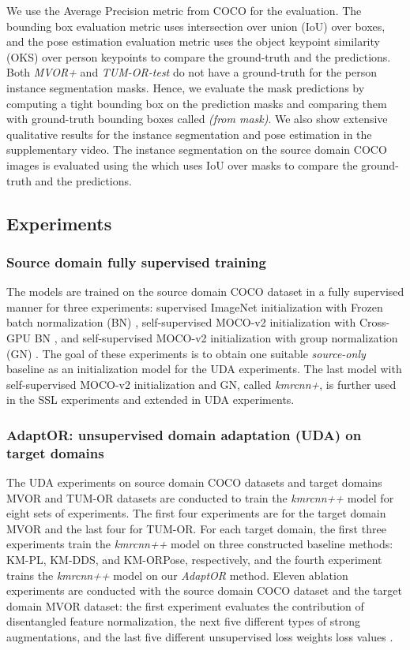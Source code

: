 We use the Average Precision \emph{} metric from COCO \citep{lin2014microsoft} for the evaluation. The bounding box evaluation metric \emph{} uses intersection over union (IoU) over boxes, and the pose estimation evaluation metric \emph{} uses the object keypoint similarity (OKS) over person keypoints to compare the ground-truth and the predictions. Both \emph{MVOR+} and \emph{TUM-OR-test} do not have a ground-truth for the person instance segmentation masks. Hence, we evaluate the mask predictions by computing a tight bounding box on the prediction masks and comparing them with ground-truth bounding boxes called \emph{ (from mask)}. We also show extensive qualitative results for the instance segmentation and pose estimation in the supplementary video. The instance segmentation on the source domain COCO images is evaluated using the \emph{} which uses IoU over masks to compare the ground-truth and the predictions.

\subsection{Experiments}
\subsubsection{Source domain fully supervised training} \label{sdfs}
The models are trained on the source domain COCO dataset in a fully supervised manner for three experiments: supervised ImageNet initialization with Frozen batch normalization (BN) \citep{he2016deep}, self-supervised MOCO-v2 initialization \citep{chen2020simple,he2020momentum} with Cross-GPU BN \citep{peng2018megdet}, and self-supervised MOCO-v2 initialization \citep{chen2020simple,he2020momentum} with group normalization (GN) \citep{wu2018group}. The goal of these experiments is to obtain one suitable \emph{source-only} baseline as an initialization model for the UDA experiments. The last model with self-supervised MOCO-v2 initialization and GN, called \emph{kmrcnn+}, is further used in the SSL experiments and extended in UDA experiments.
\subsubsection{AdaptOR: unsupervised domain adaptation (UDA) on target domains} \label{stduda}
The UDA experiments on source domain COCO datasets and target domains MVOR and TUM-OR datasets are conducted to train the \emph{kmrcnn++} model for eight sets of experiments. The first four experiments are for the target domain MVOR and the last four for TUM-OR. For each target domain, the first three experiments train the \emph{kmrcnn++} model on three constructed baseline methods: KM-PL, KM-DDS, and KM-ORPose, respectively, and the fourth experiment trains the \emph{kmrcnn++} model on our \emph{AdaptOR} method. Eleven ablation experiments are conducted with the source domain COCO dataset and the target domain MVOR dataset: the first experiment evaluates the contribution of disentangled feature normalization, the next five different types of strong augmentations, and the {\blue last five different unsupervised loss weights loss values }.
